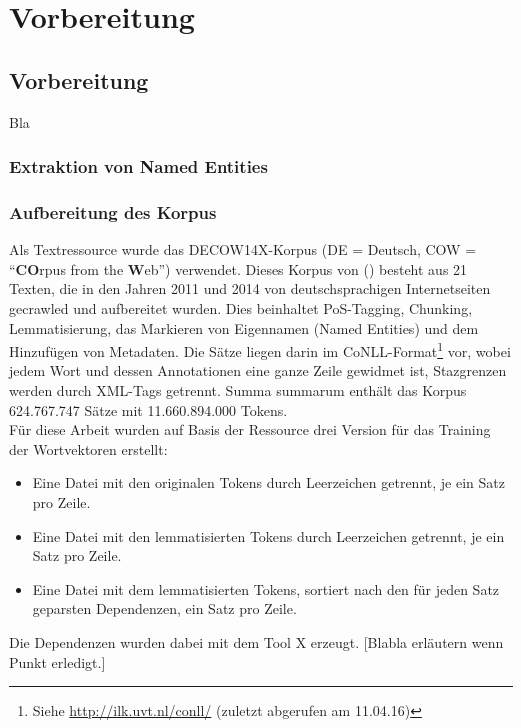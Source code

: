 
\chapter{Vorbereitung} %

\label{Chapter4} %


\section{Vorbereitung}
Bla

  \subsection{Extraktion von Named Entities}

  \subsection{Aufbereitung des Korpus}

  Als Textressource wurde das DECOW14X-Korpus (DE = Deutsch, COW = ``\textbf{CO}rpus from the \textbf{W}eb'') verwendet.
  Dieses Korpus von (\cite{schafer2012building})  besteht aus 21 Texten,
  die in den Jahren 2011 und 2014 von deutschsprachigen Internetseiten gecrawled und aufbereitet wurden. Dies beinhaltet
  PoS-Tagging, Chunking, Lemmatisierung, das Markieren von Eigennamen (Named Entities) und dem Hinzufügen von Metadaten.
  Die Sätze liegen darin im CoNLL-Format\footnote{Siehe \url{http://ilk.uvt.nl/conll/} (zuletzt abgerufen am 11.04.16)} vor,
  wobei jedem Wort und dessen Annotationen eine ganze Zeile gewidmet ist,
  Stazgrenzen werden durch XML-Tags getrennt. Summa summarum enthält das Korpus 624.767.747 Sätze mit 11.660.894.000 Tokens.\\

  Für diese Arbeit wurden auf Basis der Ressource drei Version für das Training der Wortvektoren erstellt:
  \begin{itemize}
      \item Eine Datei mit den originalen Tokens durch Leerzeichen getrennt, je ein Satz pro Zeile.
      \item Eine Datei mit den lemmatisierten Tokens durch Leerzeichen getrennt, je ein Satz pro Zeile.
      \item Eine Datei mit dem lemmatisierten Tokens, sortiert nach den für jeden Satz geparsten Dependenzen, ein Satz pro Zeile.
  \end{itemize}
  Die Dependenzen wurden dabei mit dem Tool X erzeugt. [Blabla erläutern wenn Punkt erledigt.]


